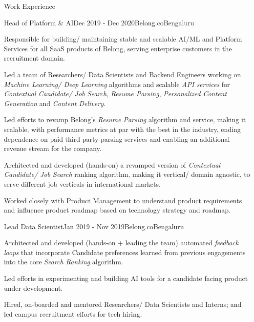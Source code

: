 \documentclass{resume} %
\begin{document}
\begin{rSection}{Work Experience}

\begin{rSubsection}{Head of Platform \& AI}{Dec 2019 - Dec 2020}{Belong.co}{Bengaluru}
\item Responsible for building/ maintaining stable and scalable AI/ML and Platform Services for all SaaS products of Belong, serving enterprise customers in the recruitment domain.
\item Led a team of Researchers/ Data Scientists and Backend Engineers working on {\em Machine Learning/ Deep Learning} algorithms and scalable {\em API services} for {\em Contextual Candidate/ Job Search}, {\em Resume Parsing}, {\em Personalized Content Generation} and {\em Content Delivery}.
\item Led efforts to revamp Belong's {\em Resume Parsing} algorithm and service, making it scalable, with performance metrics at par with the best in the industry, ending dependence on paid third-party parsing services and enabling an additional revenue stream for the company.
\item Architected and developed (hands-on) a revamped version of  {\em Contextual Candidate/ Job Search} ranking algorithm, making it vertical/ domain agnostic, to  serve different job verticals in international markets.
\item Worked closely with Product Management to understand product requirements and influence product roadmap based on technology strategy and roadmap.

\end{rSubsection}

\begin{rSubsection}{Lead Data Scientist}{Jan 2019 - Nov 2019}{Belong.co}{Bengaluru}
\item Architected and developed (hands-on + leading the team) automated {\em feedback loops} that incorporate Candidate preferences learned from previous engagements into the core {\em Search Ranking} algorithm.
\item Led efforts in experimenting and building AI tools for a candidate facing product under development. 
\item Hired, on-boarded and mentored Researchers/ Data Scientists and Interns; and led campus recruitment efforts for tech hiring.
\end{rSubsection}


\end{rSection}
\end{document}
